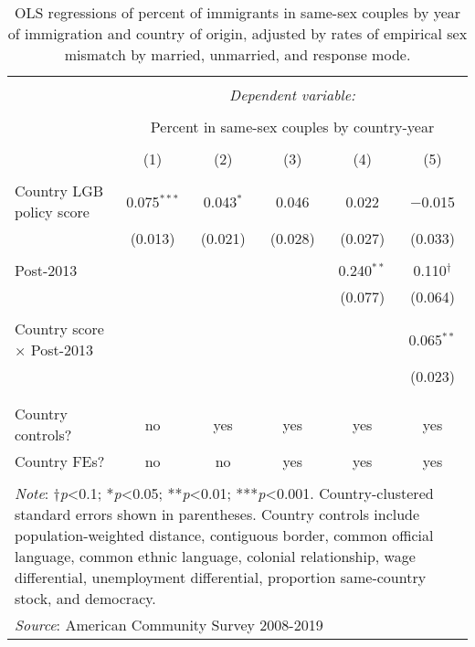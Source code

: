 \documentclass[
  11pt,
]{article}
\begin{document}
\begin{table}[H] \centering 
  \caption{OLS regressions of percent of immigrants in same-sex couples by year of immigration and country of origin, adjusted by rates of empirical sex mismatch by married, unmarried, and response mode. } 
  \label{tab:country-props-adj} 
\begin{tabular}{@{\extracolsep{5pt}}lccccc} 
\\[-1.8ex]\hline 
\hline \\[-1.8ex] 
 & \multicolumn{5}{c}{\textit{Dependent variable:}} \\ 
\cline{2-6} 
\\[-1.8ex] & \multicolumn{5}{c}{Percent in same-sex couples by country-year} \\ 
\\[-1.8ex] & (1) & (2) & (3) & (4) & (5)\\ 
\hline \\[-1.8ex] 
 Country LGB policy score & 0.075$^{***}$ & 0.043$^{*}$ & 0.046 & 0.022 & $-$0.015 \\ 
  & (0.013) & (0.021) & (0.028) & (0.027) & (0.033) \\ 
  & & & & & \\ 
 Post-2013 &  &  &  & 0.240$^{**}$ & 0.110$^{†}$ \\ 
  &  &  &  & (0.077) & (0.064) \\ 
  & & & & & \\ 
 Country score × Post-2013 &  &  &  &  & 0.065$^{**}$ \\ 
  &  &  &  &  & (0.023) \\ 
  & & & & & \\ 
\hline \\[-1.8ex] 
Country controls? & no & yes & yes & yes & yes \\ 
Country FEs? & no & no & yes & yes & yes \\ 
\hline 
\hline \\[-1.8ex] 
\multicolumn{6}{l}{\parbox[t]{.8\textwidth}{\textit{Note}: †\textit{p}<0.1; *\textit{p}<0.05; **\textit{p}<0.01; ***\textit{p}<0.001. Country-clustered standard errors shown in parentheses. Country controls include population-weighted distance, contiguous border, common official language, common ethnic language, colonial relationship, wage differential, unemployment differential, proportion same-country stock, and democracy.}} \\ 
\multicolumn{6}{l}{\textit{Source}: American Community Survey 2008-2019} \\ 
\end{tabular} 
\end{table}
\end{document}
